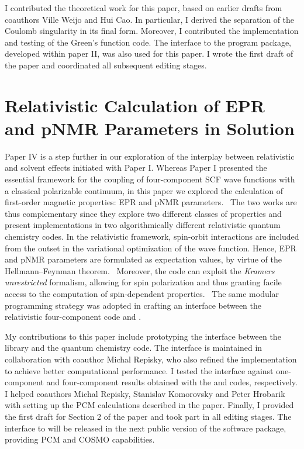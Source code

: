 I contributed the theoretical work for this paper, based on earlier drafts from coauthors
Ville Weijo and Hui Cao. In particular, I derived the separation of
the Coulomb singularity in its final form.
Moreover, I contributed the implementation and testing of the Green's function code.
The interface to the \LSDALTON program package, developed within paper II, was
also used for this paper.
I wrote the first draft of the paper and coordinated all subsequent editing stages.

\section{Relativistic Calculation of EPR and pNMR Parameters in
Solution}\label{sec:pcmepr}

Paper IV is a step further in our exploration of the interplay between
relativistic and solvent effects initiated with Paper I.
Whereas Paper I presented the essential framework for the coupling of
four-component \acs{SCF} wave functions with a classical polarizable continuum,
in this paper we explored the calculation of first-order magnetic properties:
\ac{EPR} and \ac{pNMR} parameters.~\autocite{Repisky2010-ls, Malkin2011-nm,
Komorovsky2013-xa, Cherry2016-ij}
The two works are thus complementary since they explore two different classes
of properties and present implementations in two algorithmically different
relativistic quantum chemistry codes.
In the relativistic framework, spin-orbit interactions are included from the
outset in the variational optimization of the wave function.
Hence, \acs{EPR} and \acs{pNMR} parameters are formulated as expectation
values, by virtue of the Hellmann--Feynman theorem.~\autocite{Konishi2009-zb,
Helgaker2000-tz}
Moreover, the \ReSpect code can exploit the \emph{Kramers unrestricted} formalism,
allowing for spin polarization and thus granting facile access to the computation
of spin-dependent properties.~\autocite{Dyall2007-tu}
The same modular programming strategy was adopted in crafting an interface between the
relativistic four-component code \ReSpect\autocite{ReSpect-3.5.0} and \pcmsolver.

My contributions to this paper include prototyping the interface between the
\pcmsolver library and the \ReSpect quantum chemistry code.
The interface is maintained in collaboration with coauthor Michal Repisky, who also
refined the implementation to achieve better computational performance.
I tested the interface against one-component and four-component results obtained with
the \LSDALTON and \DIRAC codes, respectively.
I helped coauthors Michal Repisky, Stanislav Komorovsky and Peter Hrobarik
with setting up the \acs{PCM} calculations described in the paper.
Finally, I provided the first draft for Section 2 of the paper and took part in all editing stages.
The interface to \ReSpect will be released in the next public version of the software
package, providing \acs{PCM} and \acs{COSMO} capabilities.

